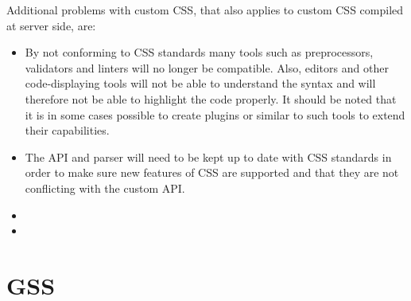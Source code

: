 \documentclass[a4paper,11pt]{kth-mag}
\begin{document}
    Additional problems with custom \gls{CSS}, that also applies to custom \gls{CSS} compiled at server side, are:
    \begin{itemize}
      \item 
        By not conforming to \gls{CSS} standards many tools such as preprocessors, validators and linters will no longer be compatible.
        Also, editors and other code-displaying tools will not be able to understand the syntax and will therefore not be able to highlight the code properly.
        It should be noted that it is in some cases possible to create plugins or similar to such tools to extend their capabilities.
      \item The \gls{API} and parser will need to be kept up to date with \gls{CSS} standards in order to make sure new features of \gls{CSS} are supported and that they are not conflicting with the custom \gls{API}.
      \item {}
      \item
    \end{itemize}

    \section{GSS}
\end{document}
